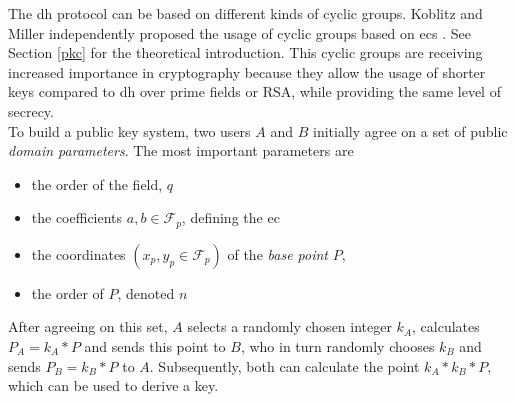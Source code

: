 The \gls{dh} protocol can be based on different kinds of cyclic groups. Koblitz and Miller independently proposed the usage of cyclic groups based on
\glspl{ec} \cite{eccKoblitz} \cite{eccMiller}. See Section \ref{pkc} for the theoretical introduction.
This cyclic groups are receiving increased importance in cryptography because they allow the usage
of shorter keys compared to \gls{dh} over prime fields or RSA, while providing the same level of secrecy.
\\
To build a public key system, two users $A$ and $B$ initially agree on a set of public \textit{domain parameters}. The most important parameters are \cite{ecDP}	
\begin{itemize}
 \item the order of the field, $q$
 \item the coefficients $a, b \in \mathcal{F}_p$, defining the \gls{ec}
 \item the coordinates $(x_p, y_p \in \mathcal{F}_p)$ of the \textit{base point} $P$, 
 \item the order of $P$, denoted $n$
\end{itemize}
After agreeing on this set, $A$ selects a randomly chosen integer $k_A$, calculates $P_A = k_A*P$ and sends
this point to $B$, who in turn randomly chooses $k_B$ and sends $P_B = k_B*P$ to $A$. Subsequently, both can calculate the point $k_A*k_B*P$, which can be used
to derive a key.

